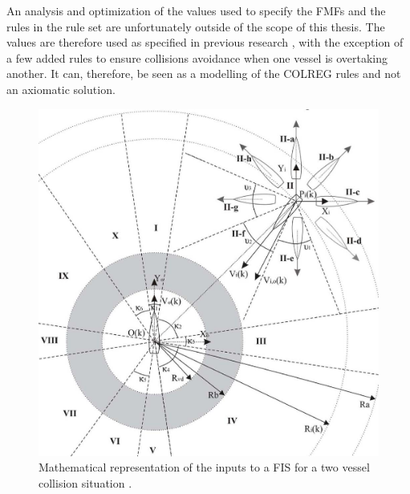 An analysis and optimization of the values used to specify the FMFs and the rules in the rule set are unfortunately outside of the scope of this thesis. The values are therefore used as specified in previous research \cite{perera2012intelligent}, with the exception of a few added rules to ensure collisions avoidance when one vessel is overtaking another. It can, therefore, be seen as a modelling of the COLREG rules and not an axiomatic solution.


\begin{figure}[H]
    \centering
    \includegraphics[width=\linewidth]{Figures/model}
    \caption[Mathematical representation of the inputs to a FIS for a two vessel collision situation.]{Mathematical representation of the inputs to a FIS for a two vessel collision situation \cite{perera2012intelligent}.}
    \label{fig:model}
\end{figure}


